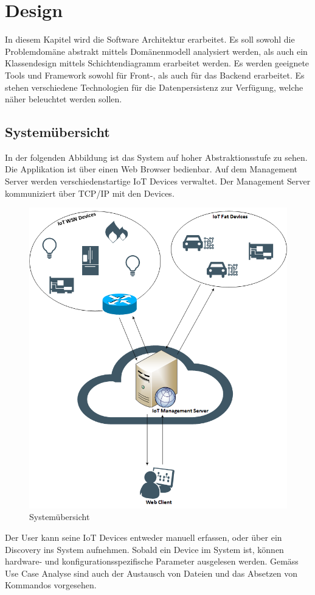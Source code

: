 \chapter{Design}
In diesem Kapitel wird die Software Architektur erarbeitet. Es soll sowohl die Problemdomäne abstrakt mittels Domänenmodell analysiert werden, als auch ein Klassendesign mittels Schichtendiagramm erarbeitet werden. Es werden geeignete Tools und Framework sowohl für Front-, als auch für das Backend erarbeitet. Es stehen verschiedene Technologien für die Datenpersistenz zur Verfügung, welche näher beleuchtet werden sollen.
\section{Systemübersicht}
In der folgenden Abbildung ist das System auf hoher Abstraktionsstufe zu sehen. Die Applikation ist über einen Web Browser bedienbar. Auf dem Management Server werden verschiedenstartige IoT Devices verwaltet. Der Management Server kommuniziert über TCP/IP mit den Devices. 
\begin{figure}[H]
\centering
\includegraphics[scale=0.6]{images/systemuebersicht.png}
\caption{Systemübersicht}
\end{figure}
Der User kann seine IoT Devices entweder manuell erfassen, oder über ein Discovery ins System aufnehmen. Sobald ein Device im System ist, können hardware- und konfigurationsspezifische Parameter ausgelesen werden. Gemäss Use Case Analyse sind auch der Austausch von Dateien und das Absetzen von Kommandos vorgesehen.

